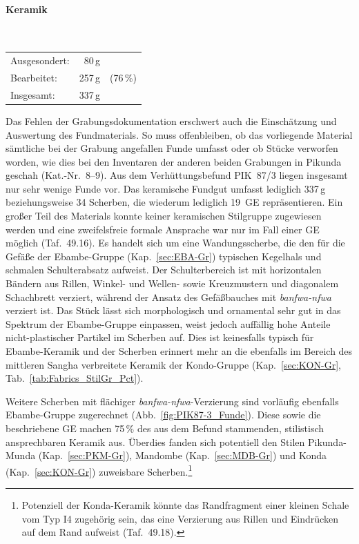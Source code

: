 \paragraph{Keramik\vspace{.5em}}\mbox{}\\
\begin{tabular}{@{}lrl@{}}
Ausgesondert: & 80\,g & \\ 
Bearbeitet: & 257\,g & (76\,\%) \\ 
Insgesamt: & 337\,g & \\ 
\end{tabular} 

\vspace{1em}
\noindent Das Fehlen der Grabungsdokumentation erschwert auch die Einschätzung und Auswertung des Fundmaterials. So muss offenbleiben, ob das vorliegende Material sämtliche bei der Grabung angefallen Funde umfasst oder ob Stücke verworfen worden, wie dies bei den Inventaren der anderen beiden Grabungen in Pikunda geschah (Kat.-Nr.~8--9). Aus dem Verhüttungsbefund PIK~87/3 liegen insgesamt nur sehr wenige Funde vor. Das keramische Fundgut umfasst lediglich 337\,g beziehungsweise 34 Scherben, die wiederum lediglich 19~GE repräsentieren. Ein großer Teil des Materials konnte keiner keramischen Stilgruppe zugewiesen werden und eine zweifelsfreie formale Ansprache war nur im Fall einer GE möglich (Taf.~49.16). Es handelt sich um eine Wandungsscherbe, die den für die Gefäße der Ebambe-Gruppe (Kap.~\ref{sec:EBA-Gr}) typischen Kegelhals und schmalen Schulterabsatz aufweist. Der Schulterbereich ist mit horizontalen Bändern aus Rillen, Winkel- und Wellen- sowie Kreuzmustern und diagonalem Schachbrett verziert, während der Ansatz des Gefäßbauches mit \textit{banfwa-nfwa} verziert ist. Das Stück lässt sich morphologisch und ornamental sehr gut in das Spektrum der Ebambe-Gruppe einpassen, weist jedoch auffällig hohe Anteile nicht-plastischer Partikel im Scherben auf. Dies ist keinesfalls typisch für Ebambe-Keramik und der Scherben erinnert mehr an die ebenfalls im Bereich des mittleren \mbox{Sangha} verbreitete Keramik der Kondo-Gruppe (Kap.~\ref{sec:KON-Gr}, Tab.~\ref{tab:Fabrics_StilGr_Pct}).

Weitere Scherben mit flächiger \textit{banfwa-nfwa}-Verzierung sind vorläufig ebenfalls Ebambe-Gruppe zugerechnet (Abb.~\ref{fig:PIK87-3_Funde}). Diese sowie die beschriebene GE machen 75\,\% des aus dem Befund stammenden, stilistisch ansprechbaren Keramik aus. Überdies fanden sich potentiell den Stilen Pikunda-Munda (Kap.~\ref{sec:PKM-Gr}), Mandombe (Kap.~\ref{sec:MDB-Gr}) und Konda (Kap.~\ref{sec:KON-Gr}) zuweisbare Scherben.\footnote{Potenziell der Konda-Keramik könnte das Randfragment einer kleinen Schale vom Typ I4 zugehörig sein, das eine Verzierung aus Rillen und Eindrücken auf dem Rand aufweist (Taf.~49.18).}

